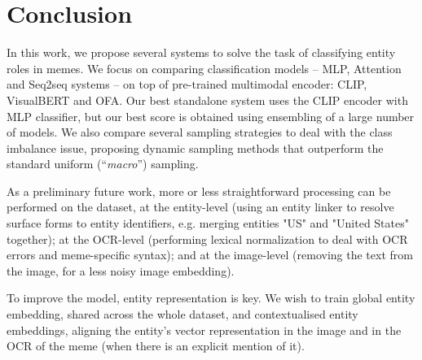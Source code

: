 \section{Conclusion}

In this work, we propose several systems to solve the task of classifying entity roles in memes. We focus on comparing classification models -- MLP, Attention and Seq2seq systems -- on top of pre-trained multimodal encoder: CLIP, VisualBERT and OFA. Our best standalone system uses the CLIP encoder with MLP classifier, but our best score is obtained using ensembling of a large number of models. 
We also compare several sampling strategies to deal with the class imbalance issue, proposing dynamic sampling methods that outperform the standard uniform (``\textsl{macro}'') sampling.

As a preliminary future work, more or less straightforward processing can be performed on the dataset, at the entity-level (using an entity linker to resolve surface forms to entity identifiers, e.g. merging entities "US" and "United States" together); at the OCR-level (performing lexical normalization \cite{samuel-straka-2021-ufal} to deal with OCR errors and meme-specific syntax); and at the image-level (removing the text from the image, for a less noisy image embedding).

To improve the model, entity representation is key. We wish to train global entity embedding, shared across the whole dataset, and contextualised entity embeddings, aligning the entity's vector representation in the image and in the OCR of the meme (when there is an explicit mention of it).


